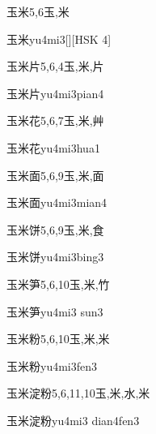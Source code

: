 \begin{Entry}{玉米}{5,6}{⽟,⽶}
  \begin{Phonetics}{玉米}{yu4mi3}[][HSK 4]
  \end{Phonetics}
\end{Entry}

\begin{Entry}{玉米片}{5,6,4}{⽟,⽶,⽚}
  \begin{Phonetics}{玉米片}{yu4mi3pian4}
  \end{Phonetics}
\end{Entry}

\begin{Entry}{玉米花}{5,6,7}{⽟,⽶,⾋}
  \begin{Phonetics}{玉米花}{yu4mi3hua1}
  \end{Phonetics}
\end{Entry}

\begin{Entry}{玉米面}{5,6,9}{⽟,⽶,⾯}
  \begin{Phonetics}{玉米面}{yu4mi3mian4}
  \end{Phonetics}
\end{Entry}

\begin{Entry}{玉米饼}{5,6,9}{⽟,⽶,⾷}
  \begin{Phonetics}{玉米饼}{yu4mi3bing3}
  \end{Phonetics}
\end{Entry}

\begin{Entry}{玉米笋}{5,6,10}{⽟,⽶,⽵}
  \begin{Phonetics}{玉米笋}{yu4mi3 sun3}
  \end{Phonetics}
\end{Entry}

\begin{Entry}{玉米粉}{5,6,10}{⽟,⽶,⽶}
  \begin{Phonetics}{玉米粉}{yu4mi3fen3}
  \end{Phonetics}
\end{Entry}

\begin{Entry}{玉米淀粉}{5,6,11,10}{⽟,⽶,⽔,⽶}
  \begin{Phonetics}{玉米淀粉}{yu4mi3 dian4fen3}
  \end{Phonetics}
\end{Entry}

